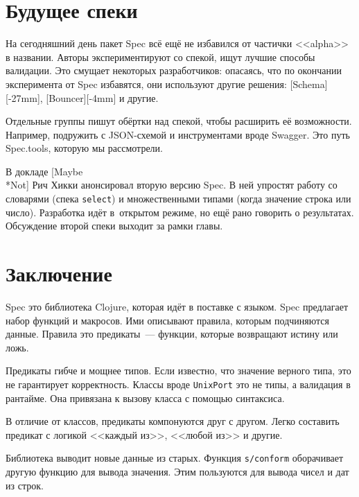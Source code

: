 \section{Будущее спеки}


На сегодняшний день пакет Spec всё ещё не избавился от частички
<<alpha>> в названии. Авторы экспериментируют со спекой, ищут лучшие способы
валидации. Это смущает некоторых разработчиков: опасаясь, что по окончании
эксперимента от Spec избавятся, они используют другие решения:
[Schema][-27mm],
[Bouncer][-4mm] и другие.

Отдельные группы пишут обёртки над спекой, чтобы расширить её
возможности. Например, подружить с JSON-схемой и инструментами вроде
Swagger. Это путь Spec.tools, которую мы рассмотрели.


В докладе [Maybe\\*Not] Рич
Хикки анонсировал вторую версию Spec. В ней упростят работу со словарями (спека
\verb|select|) и множественными типами (когда значение строка или
число). Разработка идёт в~открытом режиме, но ещё рано говорить о
результатах. Обсуждение второй спеки выходит за рамки главы.

\section{Заключение}

Spec это библиотека Clojure, которая идёт в поставке с языком. Spec предлагает
набор функций и макросов. Ими описывают правила, которым подчиняются
данные. Правила это предикаты~--- функции, которые возвращают истину или ложь.

Предикаты гибче и мощнее типов. Если известно, что значение верного типа, это не
гарантирует корректность. Классы вроде \verb|UnixPort| это не типы, а
валидация в рантайме. Она привязана к вызову класса с помощью синтаксиса.

В отличие от классов, предикаты компонуются друг с другом. Легко составить
предикат с логикой <<каждый из>>, <<любой из>> и другие.

Библиотека выводит новые данные из старых. Функция \verb|s/conform|
оборачивает другую функцию для вывода значения. Этим пользуются для вывода чисел
и дат из строк.

